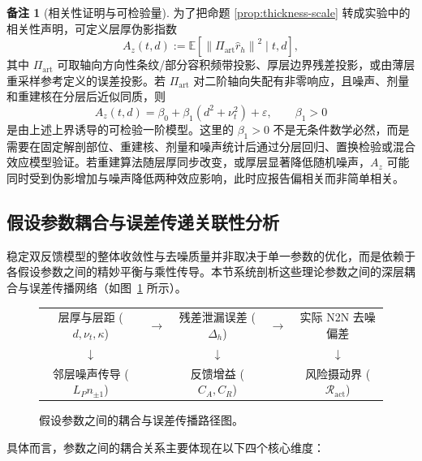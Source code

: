 \documentclass[11pt,a4paper,UTF8,fontset=fandol]{ctexart}
\theoremstyle{definition}
\newtheorem{remark}[theorem]{备注}
\newcommand{\norm}[1]{\left\lVert#1\right\rVert}
\newcommand{\E}{\mathbb{E}}
\begin{document}
\begin{remark}[相关性证明与可检验量]
为了把命题 \ref{prop:thickness-scale} 转成实验中的相关性声明，可定义层厚伪影指数
\begin{equation}
\label{eq:thickness-artifact-index}
    A_z(t,d)
    :=
    \E\left[
    \norm{\Pi_{\mathrm{art}}\hat r_h}^2
    \mid t,d
    \right],
\end{equation}
其中 $\Pi_{\mathrm{art}}$ 可取轴向方向性条纹/部分容积频带投影、厚层边界残差投影，或由薄层重采样参考定义的误差投影。若 $\Pi_{\mathrm{art}}$ 对二阶轴向失配有非零响应，且噪声、剂量和重建核在分层后近似同质，则
\begin{equation}
\label{eq:artifact-regression}
    A_z(t,d)
    =
    \beta_0+\beta_1(d^2+\nu_t^2)+\varepsilon,
    \qquad
    \beta_1>0
\end{equation}
是由上述上界诱导的可检验一阶模型。这里的 $\beta_1>0$ 不是无条件数学必然，而是需要在固定解剖部位、重建核、剂量和噪声统计后通过分层回归、置换检验或混合效应模型验证。若重建算法随层厚同步改变，或厚层显著降低随机噪声，$A_z$ 可能同时受到伪影增加与噪声降低两种效应影响，此时应报告偏相关而非简单相关。
\end{remark}

\subsection{假设参数耦合与误差传递关联性分析}
\label{sec:parameter-coupling}

稳定双反馈模型的整体收敛性与去噪质量并非取决于单一参数的优化，而是依赖于各假设参数之间的精妙平衡与乘性传导。本节系统剖析这些理论参数之间的深层耦合与误差传播网络（如图~\ref{fig:parameter-coupling} 所示）。

\begin{figure}[htbp]
\centering
\small
\begin{tabular}{ccccc}
层厚与层距 ($d, \nu_t, \kappa$) & $\longrightarrow$ & 残差泄漏误差 ($\Delta_h$) & $\longrightarrow$ & 实际 N2N 去噪偏差 \\
$\downarrow$ & & $\downarrow$ & & $\downarrow$ \\
邻层噪声传导 ($L_P n_{\pm1}$) & & 反馈增益 ($C_A, C_R$) & & 风险摄动界 ($\mathcal{R}_{\mathrm{act}}$) \\
\end{tabular}
\caption{假设参数之间的耦合与误差传播路径图。}
\label{fig:parameter-coupling}
\end{figure}

具体而言，参数之间的耦合关系主要体现在以下四个核心维度：
\end{document}
